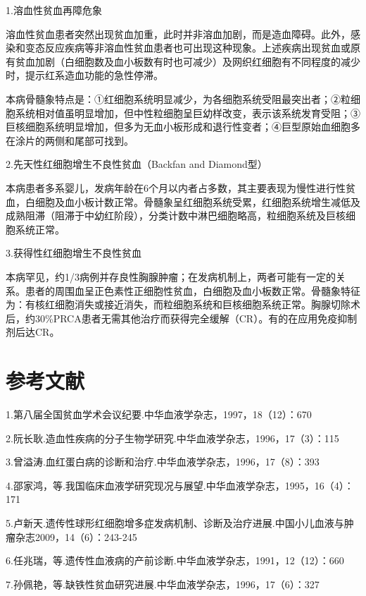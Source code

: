 \hypertarget{text00261.htmlux5cux23CHP33-6-3-4-7-3-1}{}
1.溶血性贫血再障危象

溶血性贫血患者突然出现贫血加重，此时并非溶血加剧，而是造血障碍。此外，感染和变态反应疾病等非溶血性贫血患者也可出现这种现象。上述疾病出现贫血或原有贫血加剧（白细胞数及血小板数有时也可减少）及网织红细胞有不同程度的减少时，提示红系造血功能的急性停滞。

本病骨髓象特点是：①红细胞系统明显减少，为各细胞系统受阻最突出者；②粒细胞系统相对值虽明显增加，但中性粒细胞呈巨幼样改变，表示该系统发育受阻；③巨核细胞系统明显增加，但多为无血小板形成和退行性变者；④巨型原始血细胞多在涂片的两侧和尾部可找到。

\hypertarget{text00261.htmlux5cux23CHP33-6-3-4-7-3-2}{}
2.先天性红细胞增生不良性贫血（Backfan and Diamond型）

本病患者多系婴儿，发病年龄在6个月以内者占多数，其主要表现为慢性进行性贫血，白细胞及血小板计数正常。骨髓象呈红细胞系统受累，红细胞系统增生减低及成熟阻滞（阻滞于中幼红阶段），分类计数中淋巴细胞略高，粒细胞系统及巨核细胞系统正常。

\hypertarget{text00261.htmlux5cux23CHP33-6-3-4-7-3-3}{}
3.获得性红细胞增生不良性贫血

本病罕见，约1/3病例并存良性胸腺肿瘤；在发病机制上，两者可能有一定的关系。患者的周围血呈正色素性正细胞性贫血，白细胞及血小板数正常。骨髓象特征为：有核红细胞消失或接近消失，而粒细胞系统和巨核细胞系统正常。胸腺切除术后，约30\%PRCA患者无需其他治疗而获得完全缓解（CR）。有的在应用免疫抑制剂后达CR。

\protect\hypertarget{text00262.html}{}{}

\section{参考文献}

1.第八届全国贫血学术会议纪要.中华血液学杂志，1997，18（12）：670

2.阮长耿.造血性疾病的分子生物学研究.中华血液学杂志，1996，17（3）：115

3.曾溢涛.血红蛋白病的诊断和治疗.中华血液学杂志，1996，17（8）：393

4.邵家鸿，等.我国临床血液学研究现况与展望.中华血液学杂志，1995，16（4）：171

5.卢新天.遗传性球形红细胞增多症发病机制、诊断及治疗进展.中国小儿血液与肿瘤杂志2009，14（6）：243-245

6.任兆瑞，等.遗传性血液病的产前诊断.中华血液学杂志，1991，12（12）：660

7.孙佩艳，等.缺铁性贫血研究进展.中华血液学杂志，1996，17（6）：327

